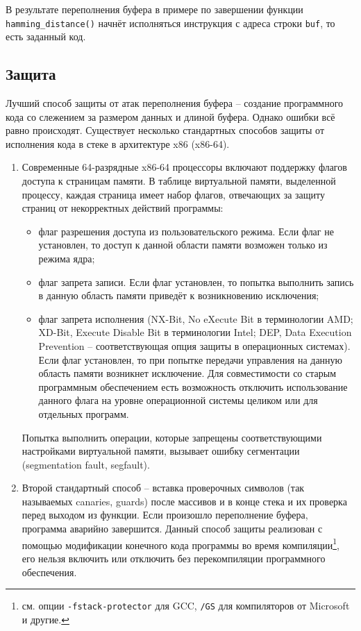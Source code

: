В результате переполнения буфера в примере по завершении функции \texttt{hamming\_distance()} начнёт исполняться инструкция с адреса строки \texttt{buf}, то есть заданный код.


\subsection{Защита}

Лучший способ защиты от атак переполнения буфера -- создание программного кода со слежением за размером данных и длиной буфера. Однако ошибки всё равно происходят. Существует несколько стандартных способов защиты от исполнения кода в стеке в архитектуре x86 (x86-64).

\begin{enumerate}
	\item Современные 64-разрядные x86-64 процессоры включают поддержку флагов доступа к страницам памяти. В таблице виртуальной памяти, выделенной процессу, каждая страница имеет набор флагов, отвечающих за защиту страниц от некорректных действий программы:
	\begin{itemize}
		\item флаг разрешения доступа из пользовательского режима. Если флаг не установлен, то доступ к данной области памяти возможен только из режима ядра;
		\item флаг запрета записи. Если флаг установлен, то попытка выполнить запись в данную область памяти приведёт к возникновению исключения;
		\item флаг запрета исполнения (NX-Bit, No eXecute Bit в терминологии AMD; XD-Bit, Execute Disable Bit в терминологии Intel; DEP, Data Execution Prevention -- соответствующая опция защиты в операционных системах). Если флаг установлен, то при попытке передачи управления на данную область памяти возникнет исключение. Для совместимости со старым программным обеспечением есть возможность отключить использование данного флага на уровне операционной системы целиком или для отдельных программ.
	\end{itemize}
	Попытка выполнить операции, которые запрещены соответствующими настройками виртуальной памяти, вызывает ошибку сегментации (segmentation fault, segfault).

    \item Второй стандартный способ -- вставка проверочных символов (так называемых canaries, guards) после массивов и в конце стека и их проверка перед выходом из функции. Если произошло переполнение буфера, программа аварийно завершится. Данный способ защиты реализован с помощью модификации конечного кода программы во время компиляции\footnote{см. опции \texttt{-fstack-protector} для GCC, \texttt{/GS} для компиляторов от Microsoft и другие.}, его нельзя включить или отключить без перекомпиляции программного обеспечения.


\end{enumerate}
